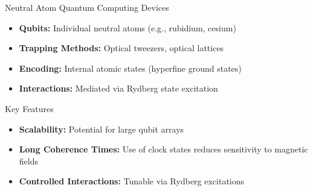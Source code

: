 \documentclass{beamer}
\begin{document}
\begin{frame}{Neutral Atom Quantum Computing Devices}
    \begin{itemize}
        \item \textbf{Qubits:} Individual neutral atoms (e.g., rubidium, cesium)
        \item \textbf{Trapping Methods:} Optical tweezers, optical lattices
        \item \textbf{Encoding:} Internal atomic states (hyperfine ground states)
        \item \textbf{Interactions:} Mediated via Rydberg state excitation
    \end{itemize}
\end{frame}

\begin{frame}{Key Features}
    \begin{itemize}
        \item \textbf{Scalability:} Potential for large qubit arrays
        \item \textbf{Long Coherence Times:} Use of clock states reduces sensitivity to magnetic fields
        \item \textbf{Controlled Interactions:} Tunable via Rydberg excitations
    \end{itemize}
\end{frame}
\end{document}
